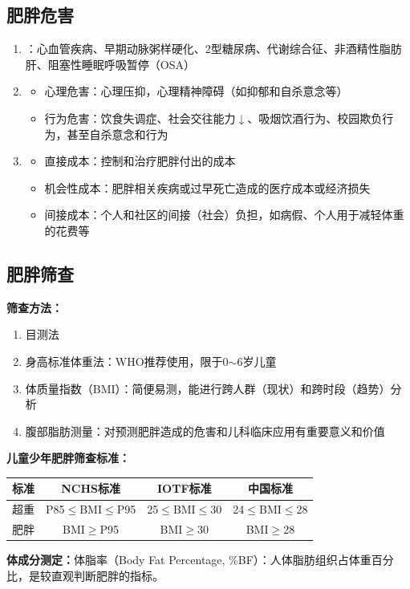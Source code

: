 \subsection{肥胖危害}

\begin{keybox}
\begin{enumerate}[leftmargin=*]
    \item {}：心血管疾病、早期动脉粥样硬化、2型糖尿病、代谢综合征、非酒精性脂肪肝、阻塞性睡眠呼吸暂停（OSA）
    \item {}
    \begin{itemize}[leftmargin=*]
        \item 心理危害：心理压抑，心理精神障碍（如抑郁和自杀意念等）
        \item 行为危害：饮食失调症、社会交往能力$\downarrow$、吸烟饮酒行为、校园欺负行为，甚至自杀意念和行为
    \end{itemize}
    \item {}
    \begin{itemize}[leftmargin=*]
        \item 直接成本：控制和治疗肥胖付出的成本
        \item 机会性成本：肥胖相关疾病或过早死亡造成的医疗成本或经济损失
        \item 间接成本：个人和社区的间接（社会）负担，如病假、个人用于减轻体重的花费等
    \end{itemize}
\end{enumerate}
\end{keybox}

\subsection{肥胖筛查}

\begin{defbox}
\textbf{筛查方法：}
\begin{enumerate}[leftmargin=*]
    \item 目测法
    \item 身高标准体重法：WHO推荐使用，限于0$\sim$6岁儿童
    \item 体质量指数（BMI）：简便易测，能进行跨人群（现状）和跨时段（趋势）分析
    \item 腹部脂肪测量：对预测肥胖造成的危害和儿科临床应用有重要意义和价值
\end{enumerate}

\textbf{儿童少年肥胖筛查标准：}
\begin{table}[h]
\centering
\begin{tabular}{lccc}
\hline
标准 & NCHS标准 & IOTF标准 & 中国标准 \\
\hline
超重 & P85$\leq$BMI$\leq$P95 & 25$\leq$BMI$\leq$30 & 24$\leq$BMI$\leq$28 \\
肥胖 & BMI$\geq$P95 & BMI$\geq$30 & BMI$\geq$28 \\
\hline
\end{tabular}
\end{table}

\textbf{体成分测定：}体脂率（Body Fat Percentage, \%BF）：人体脂肪组织占体重百分比，是较直观判断肥胖的指标。
\end{defbox}

